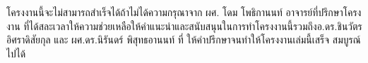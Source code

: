 \begin{acknowledgments}
 \hspace{1.27cm}โครงงานนี้จะไม่สามารถสำเร็จได้ถ้าไม่ได้ความกรุณาจาก ผศ. โดม โพธิกานนท์ อาจารย์ที่ปรึกษาโครงงาน ที่ได้สละเวลาให้ความช่วยเหลือให้คำแนะนำและสนับสนุนในการทำโครงงานนี้รวมถึงอ.ดร.ชินวัตร อิศราดิสัยกุล  และ ผศ.ดร.นิรันดร์ พิสุทธอานนท์ ที่ ให้คำปรึกษาจนทำให้โครงงานเล่มนี้เสร็จ
สมบูรณ์ไปได้


\end{acknowledgments}%
\fi %

\contentspage

\ifproject
\figurelistpage

\tablelistpage
\fi %



